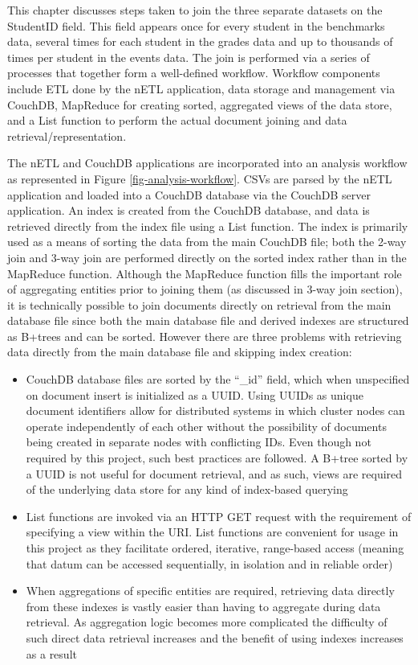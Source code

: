 This chapter discusses steps taken to join the three separate datasets on the StudentID field. This field appears once for every student in the benchmarks data, several times for each student in the grades data and up to thousands of times per student in the events data. The join is performed via a series of processes that together form a well-defined workflow. Workflow components include ETL done by the nETL application, data storage and management via CouchDB, MapReduce for creating sorted, aggregated views of the data store, and a List function to perform the actual document joining and data retrieval/representation.

The nETL and CouchDB applications are incorporated into an analysis workflow as represented in Figure \ref{fig-analysis-workflow}. CSVs are parsed by the nETL application and loaded into a CouchDB database via the CouchDB server application. An index is created from the CouchDB database, and data is retrieved directly from the index file using a List function. The index is primarily used as a means of sorting the data from the main CouchDB file; both the 2-way join and 3-way join are performed directly on the sorted index rather than in the MapReduce function. Although the MapReduce function fills the important role of aggregating entities prior to joining them (as discussed in 3-way join section), it is technically possible to join documents directly on retrieval from the main database file since both the main database file and derived indexes are structured as B+trees and can be sorted. However there are three problems with retrieving data directly from the main database file and skipping index creation:

\begin{itemize}
    \item CouchDB database files are sorted by the ``\_id'' field, which when unspecified on document insert is initialized as a UUID. Using UUIDs as unique document identifiers allow for distributed systems in which cluster nodes can operate independently of each other without the possibility of documents being created in separate nodes with conflicting IDs. Even though not required by this project, such best practices are followed. A B+tree sorted by a UUID is not useful for document retrieval, and as such, views are required of the underlying data store for any kind of index-based querying
    \item List functions are invoked via an HTTP GET request with the requirement of specifying a view within the URI. List functions are convenient for usage in this project as they facilitate ordered, iterative, range-based access (meaning that datum can be accessed sequentially, in isolation and in reliable order)
    \item When aggregations of specific entities are required, retrieving data directly from these indexes is vastly easier than having to aggregate during data retrieval. As aggregation logic becomes more complicated the difficulty of such direct data retrieval increases and the benefit of using indexes increases as a result
\end{itemize}

